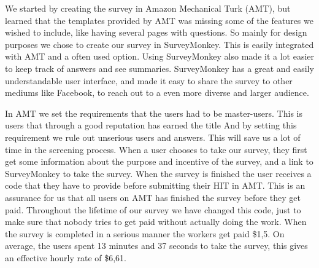We started by creating the survey in Amazon Mechanical Turk (AMT), but learned that the templates provided by AMT was missing some of the features we wished to include, like having several pages with questions. So mainly for design purposes we chose to create our survey in SurveyMonkey. This is easily integrated with AMT and a often used option.  Using SurveyMonkey also made it a lot easier to keep track of answers and see summaries. SurveyMonkey has a great and easily understandable user interface, and made it easy to share the survey to other mediums like Facebook, to reach out to a even more diverse and larger audience. 

In AMT we set the requirements that the users had to be master-users. This is users that through a good reputation has earned the title And by setting this requirement we rule out unserious users and answers. This will save us a lot of time in the screening process. When a user chooses to take our survey, they first get some information about the purpose and incentive of the survey, and a link to SurveyMonkey to take the survey. When the survey is finished the user receives a code that they have to provide before submitting their HIT in AMT. This is an assurance for us that all users on AMT has finished the survey before they get paid. Throughout the lifetime of our survey we have changed this code, just to make sure that nobody tries to get paid without actually doing the work. When the survey is completed in a serious manner the workers get paid \$1,5. On average, the users spent 13 minutes and 37 seconds to take the survey, this gives an effective hourly rate of \$6,61.     
